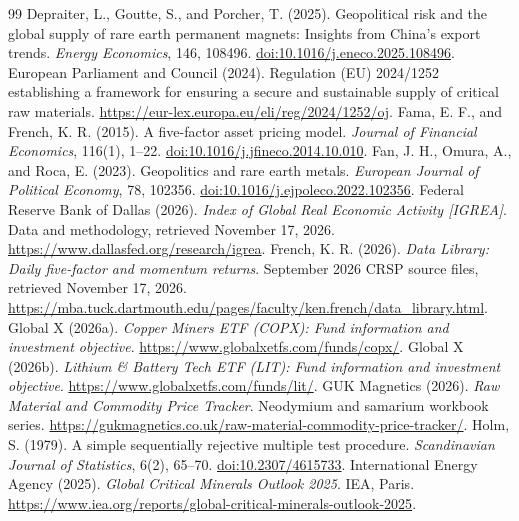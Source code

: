 \begin{thebibliography}{99}
 Depraiter, L., Goutte, S., and Porcher, T. (2025). Geopolitical risk and the global supply of rare earth permanent magnets: Insights from China's export trends. \textit{Energy Economics}, 146, 108496. \href{https://doi.org/10.1016/j.eneco.2025.108496}{doi:10.1016/j.eneco.2025.108496}.
 European Parliament and Council (2024). Regulation (EU) 2024/1252 establishing a framework for ensuring a secure and sustainable supply of critical raw materials. \url{https://eur-lex.europa.eu/eli/reg/2024/1252/oj}.
 Fama, E. F., and French, K. R. (2015). A five-factor asset pricing model. \textit{Journal of Financial Economics}, 116(1), 1–22. \href{https://doi.org/10.1016/j.jfineco.2014.10.010}{doi:10.1016/j.jfineco.2014.10.010}.
 Fan, J. H., Omura, A., and Roca, E. (2023). Geopolitics and rare earth metals. \textit{European Journal of Political Economy}, 78, 102356. \href{https://doi.org/10.1016/j.ejpoleco.2022.102356}{doi:10.1016/j.ejpoleco.2022.102356}.
 Federal Reserve Bank of Dallas (2026). \textit{Index of Global Real Economic Activity [IGREA]}. Data and methodology, retrieved November 17, 2026. \url{https://www.dallasfed.org/research/igrea}.
 French, K. R. (2026). \textit{Data Library: Daily five-factor and momentum returns}. September 2026 CRSP source files, retrieved November 17, 2026. \url{https://mba.tuck.dartmouth.edu/pages/faculty/ken.french/data_library.html}.
 Global X (2026a). \textit{Copper Miners ETF (COPX): Fund information and investment objective}. \url{https://www.globalxetfs.com/funds/copx/}.
 Global X (2026b). \textit{Lithium \& Battery Tech ETF (LIT): Fund information and investment objective}. \url{https://www.globalxetfs.com/funds/lit/}.
 GUK Magnetics (2026). \textit{Raw Material and Commodity Price Tracker}. Neodymium and samarium workbook series. \url{https://gukmagnetics.co.uk/raw-material-commodity-price-tracker/}.
 Holm, S. (1979). A simple sequentially rejective multiple test procedure. \textit{Scandinavian Journal of Statistics}, 6(2), 65–70. \href{https://doi.org/10.2307/4615733}{doi:10.2307/4615733}.
 International Energy Agency (2025). \textit{Global Critical Minerals Outlook 2025}. IEA, Paris. \url{https://www.iea.org/reports/global-critical-minerals-outlook-2025}.

\end{thebibliography}
